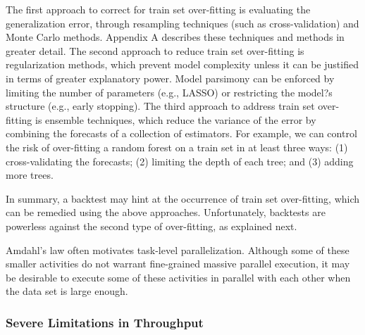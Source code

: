 \documentclass[10pt]{article}[draft]
\begin{document}
	The first approach to correct for train set over-fitting is evaluating the generalization error, through resampling techniques (such as cross-validation) and Monte Carlo methods. Appendix A describes these techniques and methods in greater detail. The second approach to reduce train set over-fitting is regularization methods, which prevent model complexity unless it can be justified in terms of greater explanatory power. Model parsimony can be enforced by limiting the number of parameters (e.g., LASSO) or restricting the model?s structure (e.g., early stopping). The third approach to address train set over-fitting is ensemble techniques, which reduce the variance of the error by combining the forecasts of a collection of estimators. For example, we can control the risk of over-fitting a random forest on a train set in at least three ways: (1) cross-validating the forecasts; (2) limiting the depth of each tree; and (3) adding more trees.
		
	In summary, a backtest may hint at the occurrence of train set over-fitting, which can be remedied using the above approaches. Unfortunately, backtests are powerless against the second type of over-fitting, as explained next.
		
	Amdahl's law often motivates task-level parallelization. Although some of these smaller activities do not warrant fine-grained massive parallel execution, it may be desirable to execute some of these activities in parallel with each other when the data set is large enough. 	
		
		\subsubsection{Severe Limitations in Throughput}
		
\end{document}
